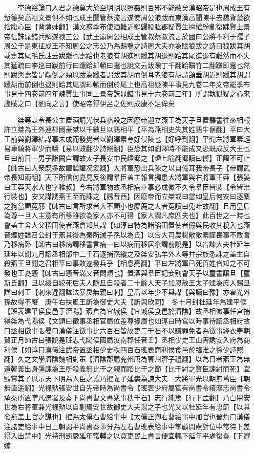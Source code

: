 　　李德裕論曰人君之德莫大於至明明以照姦則百邪不能蔽矣漢昭帝是也周成王有慙德矣高祖文景俱不如也成王聞管蔡流言遂使周公狼跋而東漢高聞陳平去魏背楚欲捨腹心臣【背蒲妹翻】漢文惑季布使酒難近罷歸股肱郡疑賈生擅權紛亂復踈賢士景帝信誅晁錯兵解遂戮三公【武王崩周公相成王管叔蔡叔流言於國曰公將不利于孺子周公于是東征成王不知周公之志公乃為䲭鴞之詩周大夫亦為賦狼跋之詩曰狼跋其胡載疐其尾毛氏註云跋躐也疐跲也老狼有胡進則躐其胡退則跲其尾進退有難然而不失其猛疏曰李廵曰跋前行曰躐跲却頓曰疐也說文云跋蹎丁千翻跲躓竹二翻躓即疐也然則跋與疐皆是顚倒之類以跋為躐者謂跋其胡而倒耳老狼有胡謂頷垂胡近則躐其胡謂躐胡而前倒也退則跲其尾謂却頓而倒於尾上也高祖疑陳平事見九卷二年文帝罷季布事見十四卷前四年疎賈生事同上景帝誅晁錯事見十六卷前三年】所謂執狐疑之心來讒賊之口【劉向之言】使昭帝得伊呂之佐則成康不足侔矣

　　桀等謀令長公主置酒請光伏兵格殺之因廢帝迎立燕王為天子旦置驛書往來相報許立桀為王外連郡國豪桀以千數旦以語相平【平為燕相史失其姓語牛倨翻】平曰大王前與劉澤結謀事未成而發覺者以劉澤素夸好侵陵也【好呼到翻】平聞左將軍素輕易車騎將軍少而驕【易以豉翻少詩照翻】臣恐其如劉澤時不能成又恐既成反大王也旦曰前日一男子詣闕自謂故太子長安中民趣郷之【趣七喻翻郷讀曰嚮】正讙不可止【師古曰人衆既多故讙譁讙况爰翻】大將軍恐出兵陳之以自備耳我帝長子【帝謂武帝長知兩翻】天下所信何憂見反後謂羣臣盖主報言獨患大將軍與右將軍王莽【張晏曰王莽天水人也字稚叔】今右將軍物故丞相病幸事必成徵不久令羣臣皆裝【令皆治行裝也】安又謀誘燕王至而誅之【誘音酉】因廢帝而立桀或曰當如皇后何安曰逐麋之狗當顧莬邪【師古曰言所求者大不顧小也糜鹿之大者莬讀曰兔吐故翻】且用皇后為尊一旦人主意有所移雖欲為家人亦不可得【家人謂凡庶匹夫也】此百世之一時也會盖主舍人父稻田使者燕倉知其謀【如淳曰特為諸稻田置使者假與民收其稅入也燕音煙姓譜召公封于燕其後為秦所滅子孫以為氏】以告大司農楊敞敞素謹畏事不敢言乃移病卧【師古曰移病謂移書言病一曰以病而移居尒謂前說是】以告諫大夫杜延年延年以聞九月詔丞相部中二千石逐捕孫縱之及桀安弘羊外人等并宗族悉誅之盖主自殺燕王旦聞之召相平曰事敗遂發兵乎【相息亮翻】平曰左將軍已死百姓皆知之不可發也王憂懣【師古曰懣音滿又音悶煩也】置酒與羣臣妃妾别會天子以璽書讓旦【璽斯氏翻】旦以綬自絞死后夫人隨旦自殺者二十餘人天子加恩赦王太子建為庶人賜旦諡曰刺王【刺來違翻諡法暴戾無親曰刺】皇后以年少不與謀【與讀曰豫】亦霍光外孫故得不廢　庚午右扶風王訢為御史大夫【訢與欣同】　冬十月封杜延年為建平侯【班表建平侯食邑于濟陽】燕倉為宜城侯【宜城侯食邑於濟隂】故丞相徵事任宫捕得桀為弋陽侯【文頴曰徵事丞相官屬位差尊掾屬也如淳曰時宫以時事待詔丞相府故曰丞相徵事張晏曰漢儀注徵事比六百石皆故吏二千石不以贓罪免者為徵事絳衣奉朝賀正月師古曰張說是班志弋陽侯國屬汝南郡任音壬】丞相少史王山夀誘安入府為商利侯【如淳曰漢儀注武帝置丞相少史秩四百石班表商利侯食邑於臨淮之徐少詩照翻】久之文學濟隂魏相對策【濟隂郡屬兖州唐為曹州濟子禮翻】以為日者燕王為無道韓義出身彊諫為王所殺義無比干之親而蹈比干之節【比干紂之賢臣諫紂而死】宜顯賞其子以示天下明為人臣之義乃擢義子延夀為諫大夫　大將軍光以朝無舊臣【朝無直遥翻】光禄勲張安世自先帝時為尚書令【班表少府屬官有尚書令續漢志尚書令承秦所置掌凡選署及奏下尚書曹文書衆事秩千石】志行純篤【行下孟翻】乃白用安世為右將軍兼光禄勲以自副焉安世故御史大夫湯之子也光又以杜延年有忠節【以其發燕盖上官之謀也】擢為太僕右曹給事中【太僕正卿右曹給事中加官也晉灼曰漢儀注諸吏給事中日上朝謁平尚書奏事分為左右曹班表給事中掌顧問慮對位中常待下盖得入出禁中】光持刑罰嚴延年常輔之以寛吏民上書言便宜輒下延年平處復奏【下遐嫁